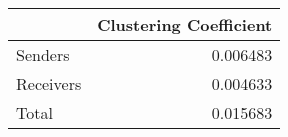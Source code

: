 \documentclass{article}
\begin{document}
\begin{tabular}{lr}
\toprule{} &         Clustering Coefficient \\ \midrule Senders    &  0.006483 \\ Receivers   &  0.004633 \\ Total &  0.015683 \\ \bottomrule
\end{tabular}
\end{document}
